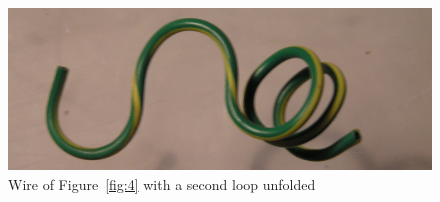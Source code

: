 %

\begin{figure}[!h]
  \centering
  \includegraphics[width=1.1\textwidth]{fig5.jpg}
  \caption{Wire of Figure~\ref{fig:4} with a second loop unfolded}
  \label{fig:5}
\end{figure}

%

